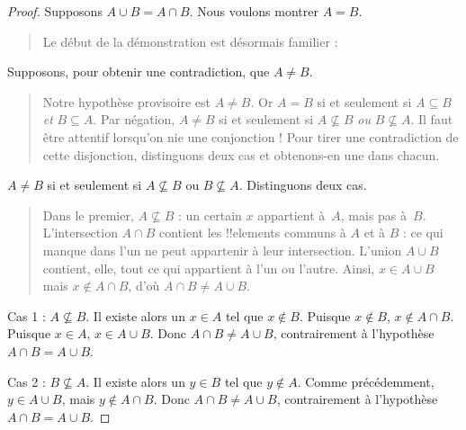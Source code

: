 \documentclass[../../../include/open-logic-section]{subfiles}
\begin{document}
\begin{proof}
  Supposons
  $A \cup B = A \cap B$.
  Nous voulons montrer
  $A = B$.
  \begin{quote}
    Le début de la
    démonstration est
    désormais familier :
  \end{quote}
  Supposons, pour obtenir
  une contradiction,
  que $A \neq B$.
  \begin{quote}
    Notre hypothèse
    provisoire est
    $A \neq B$. Or
    $A = B$ si et
    seulement si
    $A \subseteq B$
    \emph{et}
    $B \subseteq A$.
    Par négation,
    $A \neq B$ si et
    seulement si
    $A \nsubseteq B$
    \emph{ou}
    $B \nsubseteq A$.
    Il faut être
    attentif lorsqu'on
    nie une conjonction !{}
    Pour tirer une
    contradiction de
    cette disjonction,
    distinguons deux
    cas et obtenons-en
    une dans chacun.
  \end{quote}
  $A \neq B$ si et
  seulement si
  $A \nsubseteq B$
  ou $B \nsubseteq A$.
  Distinguons deux cas.
  \begin{quote}
    Dans le premier,
    $A \nsubseteq B$ :
    un certain $x$
    appartient à~$A$,
    mais pas à~$B$.
    L'intersection
    $A \cap B$ contient
    les !!{element}s
    communs à $A$
    et à $B$ :
    ce qui manque
    dans l'un ne
    peut appartenir
    à leur intersection.
    L'union $A \cup B$
    contient, elle,
    tout ce qui
    appartient à
    l'un ou l'autre.
    Ainsi,
    $x \in A \cup B$
    mais
    $x \notin A \cap B$,
    d'où
    $A \cap B \neq A \cup B$.
  \end{quote}

  Cas 1 :
  $A \nsubseteq B$.
  Il existe alors
  un $x \in A$
  tel que
  $x \notin B$.
  Puisque
  $x \notin B$,
  $x \notin A \cap B$.
  Puisque $x \in A$,
  $x \in A \cup B$.
  Donc
  $A \cap B \neq A \cup B$,
  contrairement à
  l'hypothèse
  $A \cap B = A \cup B$.

  Cas 2 :
  $B \nsubseteq A$.
  Il existe alors
  un $y \in B$
  tel que
  $y \notin A$.
  Comme précédemment,
  $y \in A \cup B$,
  mais
  $y \notin A \cap B$.
  Donc
  $A \cap B \neq A \cup B$,
  contrairement à
  l'hypothèse
  $A \cap B = A \cup B$.
\end{proof}
\end{document}
